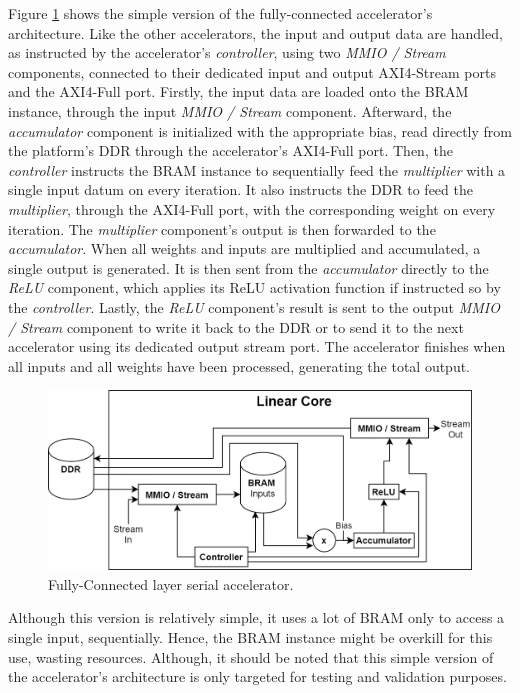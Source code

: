 Figure \ref{fig:linear-core-serial} shows the simple version of the fully-connected accelerator's architecture. Like the other accelerators, the input and output data are handled, as instructed by the accelerator's \emph{controller}, using two \emph{MMIO / Stream} components, connected to their dedicated input and output AXI4-Stream ports and the AXI4-Full port. Firstly, the input data are loaded onto the BRAM instance, through the input \emph{MMIO / Stream} component. Afterward, the \emph{accumulator} component is initialized with the appropriate bias, read directly from the platform's DDR through the accelerator's AXI4-Full port. Then, the \emph{controller} instructs the BRAM instance to sequentially feed the \emph{multiplier} with a single input datum on every iteration. It also instructs the DDR to feed the \emph{multiplier}, through the AXI4-Full port, with the corresponding weight on every iteration. The \emph{multiplier} component's output is then forwarded to the \emph{accumulator}. When all weights and inputs are multiplied and accumulated, a single output is generated. It is then sent from the \emph{accumulator} directly to the \emph{ReLU} component, which applies its ReLU activation function if instructed so by the \emph{controller}. Lastly, the \emph{ReLU} component's result is sent to the output \emph{MMIO / Stream} component to write it back to the DDR or to send it to the next accelerator using its dedicated output stream port. The accelerator finishes when all inputs and all weights have been processed, generating the total output.

\begin{figure} [H]
	\centering
	\includegraphics[width=\textwidth]{../Images/Platform/Linear_core_serial.png}
	\decoRule
	\caption[Fully-Connected layer serial accelerator]{Fully-Connected layer serial accelerator.}
	\label{fig:linear-core-serial}
\end{figure}

Although this version is relatively simple, it uses a lot of BRAM only to access a single input, sequentially. Hence, the BRAM instance might be overkill for this use, wasting resources. Although, it should be noted that this simple version of the accelerator's architecture is only targeted for testing and validation purposes.

